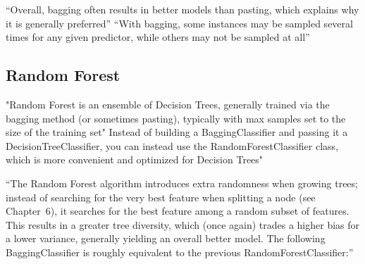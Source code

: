 \documentclass[11pt]{article}
\begin{document}


“Overall, bagging often results in better models than pasting, which explains why it is generally preferred”
“With bagging, some instances may be sampled several times for any given predictor, while others may not be sampled at all”



\subsection{Random Forest}
"Random Forest is an ensemble of Decision Trees, generally trained via the bagging method (or sometimes pasting), typically with max samples set to the size of the training set" Instead of building a BaggingClassifier and passing it a DecisionTreeClassifier, you can instead use the RandomForestClassifier class, which is more convenient and optimized for Decision Trees"


“The Random Forest algorithm introduces extra randomness when growing trees; instead of searching for the very best feature when splitting a node (see Chapter 6), it searches for the best feature among a random subset of features. This results in a greater tree diversity, which (once again) trades a higher bias for a lower variance, generally yielding an overall better model. The following BaggingClassifier is roughly equivalent to the previous RandomForestClassifier:”
\end{document}
